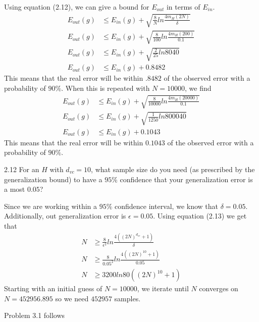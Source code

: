 \documentclass[12pt]{article}
\begin{document}
\begin{description}
\begin{doublespace}
Using equation (2.12), we can give a bound for $E_{out}$ in terms of $E_{in}$.
\begin{align*}
    E_{out}(g) &\leq E_{in}(g) + \sqrt{\frac{8}{N} ln \frac{4m_H(2N)}{\delta}}\\
    E_{out}(g) &\leq E_{in}(g) + \sqrt{\frac{8}{100} ln \frac{4m_H(200)}{0.1}}\\
    E_{out}(g) &\leq E_{in}(g) + \sqrt{\frac{2}{25} ln 8040}\\
    E_{out}(g) &\leq E_{in}(g) + 0.8482
\end{align*}
This means that the real error will be within $.8482$ of the observed error with a probability of $90\%$. When this is repeated with $N = 10000$, we find
\begin{align*}
    E_{out}(g) &\leq E_{in}(g) + \sqrt{\frac{8}{10000} ln \frac{4m_H(20000)}{0.1}}\\
    E_{out}(g) &\leq E_{in}(g) + \sqrt{\frac{1}{1250} ln 800040}\\
    E_{out}(g) &\leq E_{in}(g) + 0.1043
\end{align*}
This means that the real error will be within $0.1043$ of the observed error with a probability of $90\%$.


\item[2.12] For an $H$ with $d_{vc} = 10$, what sample size do you need (as prescribed by the generalization bound) to have a $95\%$ confidence that your generalization error is a most $0.05$?

Since we are working within a $95\%$ confidence interval, we know that $\delta = 0.05$. Additionally, out generalization error is $\epsilon = 0.05$. Using equation (2.13) we get that
\begin{align*}
    N &\geq \frac{8}{\epsilon^2} ln \frac{4((2N)^{d_{vc}} + 1)}{\delta}\\
    N &\geq \frac{8}{0.05^2} ln \frac{4((2N)^{10} + 1)}{0.05}\\
    N &\geq 3200 ln 80((2N)^{10} + 1)
\end{align*}
Starting with an initial guess of $N=10000$, we iterate until $N$ converges on $N = 452956.895$ so we need $452957$ samples.


Problem 3.1 follows

\end{doublespace}
\end{description}
\end{document}
